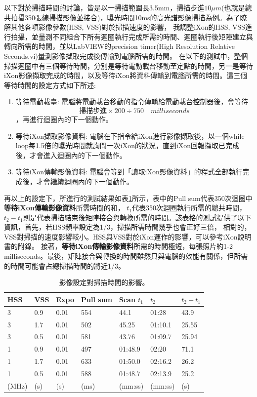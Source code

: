 \documentclass[12pt]{article}
\begin{document}
以下對於掃描時間的討論，皆是以一掃描範圍長3.5mm，掃描步進$10\mu m$(也就是總共拍攝350張線掃描影像並接合)，曝光時間10ms的高光譜影像掃描為例。為了瞭解其他各項影像參數(HSS, VSS)對於掃描速度的影響，
我調整iXon的HSS, VSS進行拍攝，並量測不同組合下所有迴圈執行完成所需的時間、迴圈執行後矩陣建立與轉向所需的時間，並以LabVIEW的precision timer(High Resolution Relative Seconds.vi)量測影像擷取完成後傳輸到電腦所需的時間。
在以下的測試中，整個掃描迴圈中有三個等待時間，分別是等待電動載台移動至定點的時間，另一是等待iXon影像擷取完成的時間，以及等待iXon將資料傳輸到電腦所需的時間。這三個等待時間的設定方式如下所述:
\begin{enumerate}
    \item 等待電動載臺: 電腦將電動載台移動的指令傳輸給電動載台控制器後，會等待\begin{equation} \label{eq: stageWait}
              \text{掃描步進}\times 200 \div 750 \quad milliseconds
          \end{equation}，再進行迴圈內的下一個動作。
    \item 等待iXon擷取影像資料: 電腦在下指令給iXon進行影像擷取後，以一個while loop每1.5倍的曝光時間就詢問一次iXon的狀況，直到iXon回報擷取已完成後，才會進入迴圈內的下一個動作。
    \item 等待iXon傳輸影像資料: 電腦會等到「讀取iXon影像資料」的程式全部執行完成後，才會繼續迴圈內的下一個動作。
\end{enumerate}
再以上的設定下，所進行的測試結果如表\ref{tab: measuring}所示，表中的Pull sum代表350次迴圈中\textbf{等待iXon傳輸影像資料}所需時間的和，
$t_1$代表350次迴圈執行所需的總共時間，$t_2-t_1$則是代表掃描結束後矩陣接合與轉換所需的時間。該表格的測試提供了以下資訊，首先，若HSS頻率設定為1/3，掃描所需時間幾乎也會正好三倍，
相對的，VSS對掃描的速度影響較小。HSS與VSS對於iXon運作的影響，可以參考iXon說明書的附錄。\cite{ixonManual}
接著，\textbf{等待iXon傳輸影像資料}所需的時間極短，每張照片約1-2 milliseconds。最後，矩陣接合與轉換的時間雖然只與電腦的效能有關係，但所需的時間可能會占總掃描時間的將近1/3。
\begin{table}[]
    \centering
    \begin{tabular}{lll||llll}
        HSS   & VSS & Expo & Pull sum & Scan $t_1$ & $t_2$   & $t_2-t_1$ \\ \hline \hline
        3     & 0.9 & 0.01 & 554      & 44.1       & 01:28   & 43.9      \\ \hline
        3     & 1.7 & 0.01 & 502      & 45.25      & 01:10.1 & 25.55     \\ \hline
        3     & 0.5 & 0.01 & 581      & 43.76      & 01:09.7 & 25.94     \\ \hline
        1     & 0.9 & 0.01 & 497      & 01:48.9    & 02:20   & 71.1      \\ \hline
        1     & 1.7 & 0.01 & 633      & 01:50.0    & 02:16.2 & 26.2      \\ \hline
        1     & 0.5 & 0.01 & 588      & 01:48.7    & 02:13.9 & 25.2      \\
        (MHz) & (s) & (s)  & (ms)     & (mm:ss)    & (mm:ss) & (s)
    \end{tabular}
    \label{tab: measuring}
    \caption{影像設定對掃描時間的影響。}
\end{table}
\end{document}
